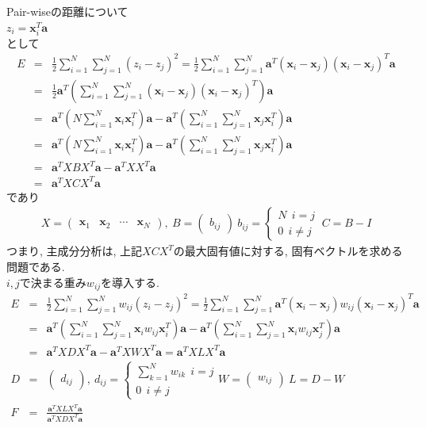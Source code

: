 \documentclass[dvipdfmx,a4j]{jsarticle}
\begin{document}
Pair-wiseの距離について\\
$z_{i}=\bm{x}_{i}^{T}\bm{a}$\\
として
\begin{eqnarray*}
    E&=&\frac{1}{2}\sum_{i=1}^{N}\sum_{j=1}^{N}(z_{i}-z_{j})^{2}=\frac{1}{2}\sum_{i=1}^{N}\sum_{j=1}^{N}\bm{a}^{T}(\bm{x}_{i}-\bm{x}_{j})(\bm{x}_{i}-\bm{x}_{j})^{T}\bm{a}\\
     &=&\frac{1}{2}\bm{a}^{T}\left(\sum_{i=1}^{N}\sum_{j=1}^{N}(\bm{x}_{i}-\bm{x}_{j})(\bm{x}_{i}-\bm{x}_{j})^{T}\right)\bm{a}\\
     &=&\bm{a}^{T}\left(N\sum_{i=1}^{N}\bm{x}_{i}\bm{x}_{i}^{T}\right)\bm{a}-\bm{a}^{T}\left(\sum_{i=1}^{N}\sum_{j=1}^{N}\bm{x}_{j}\bm{x}_{i}^{T}\right)\bm{a}\\
     &=&\bm{a}^{T}\left(N\sum_{i=1}^{N}\bm{x}_{i}\bm{x}_{i}^{T}\right)\bm{a}-\bm{a}^{T}\left(\sum_{i=1}^{N}\sum_{j=1}^{N}\bm{x}_{j}\bm{x}_{i}^{T}\right)\bm{a}\\
     &=&\bm{a}^{T}XBX^{T}\bm{a}-\bm{a}^{T}XX^{T}\bm{a}\\
     &=&\bm{a}^{T}XCX^{T}\bm{a}
\end{eqnarray*}
であり
\begin{eqnarray*}
    X=\begin{pmatrix} \bm{x}_{1}&\bm{x}_{2}&\cdots&\bm{x}_{N}\end{pmatrix},\ B=\begin{pmatrix}b_{ij}\end{pmatrix}\ b_{ij}=\left\{ \begin{array}{l} N\ \ i=j\\ 0\ \ i\neq j \end{array} \right. \ C=B-I
\end{eqnarray*}
つまり, 主成分分析は, 上記$XCX^{T}$の最大固有値に対する, 固有ベクトルを求める問題である.\\[1cm]
$i,j$で決まる重み$w_{ij}$を導入する.
\begin{eqnarray*}
    E&=&\frac{1}{2}\sum_{i=1}^{N}\sum_{j=1}^{N}w_{ij}(z_{i}-z_{j})^{2}=\frac{1}{2}\sum_{i=1}^{N}\sum_{j=1}^{N}\bm{a}^{T}(\bm{x}_{i}-\bm{x}_{j})w_{ij}(\bm{x}_{i}-\bm{x}_{j})^{T}\bm{a}\\
     &=&\bm{a}^{T}\left(\sum_{i=1}^{N}\sum_{j=1}^{N}\bm{x}_{i}w_{ij}\bm{x}_{i}^{T}\right)\bm{a}-\bm{a}^{T}\left(\sum_{i=1}^{N}\sum_{j=1}^{N}\bm{x}_{i}w_{ij}\bm{x}_{j}^{T}\right)\bm{a}\\
     &=&\bm{a}^{T}XDX^{T}\bm{a}-\bm{a}^{T}XWX^{T}\bm{a}=\bm{a}^{T}XLX^{T}\bm{a}\\
    D&=&\begin{pmatrix}d_{ij}\end{pmatrix},\ d_{ij}=\left\{ \begin{array}{l} \displaystyle \sum_{k=1}^{N}w_{ik}\ \ i=j\\ 0\ \ i\neq j \end{array} \right. W=\begin{pmatrix}w_{ij} \end{pmatrix} \ L=D-W\\
    F&=&\frac{\bm{a}^{T}XLX^{T}\bm{a}}{\bm{a}^{T}XDX^{T}\bm{a}}
\end{eqnarray*}
\end{document}
